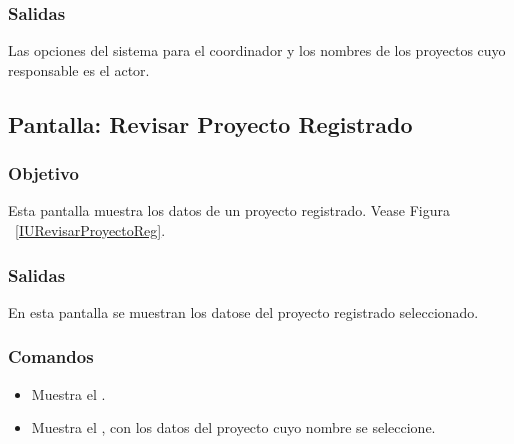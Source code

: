 
\subsubsection{Salidas}
Las opciones del sistema para el coordinador y los nombres de los proyectos cuyo responsable es el actor.

\subsection{Pantalla: Revisar Proyecto Registrado}
\subsubsection{Objetivo}
Esta pantalla muestra los datos de un proyecto registrado. Vease Figura ~\ref{IURevisarProyectoReg}.


\subsubsection{Salidas}
En esta pantalla se muestran los datose del proyecto registrado seleccionado.


\subsubsection{Comandos}
\begin{itemize}
\item {} Muestra el .
\item {} Muestra el , con los datos del proyecto cuyo nombre se seleccione.
\end{itemize}
